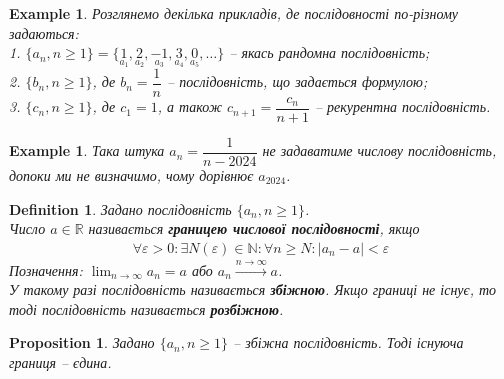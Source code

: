 \documentclass[a4paper, 14pt]{article}
\theoremstyle{theoremdd}
\theoremstyle{theoremdd}
\newtheorem{definition}[theorem]{Definition}
\theoremstyle{theoremdd}
\theoremstyle{theoremdd}
\newtheorem{example}[theorem]{Example}
\theoremstyle{theoremdd}
\newtheorem{proposition}[theorem]{Proposition}
\theoremstyle{theoremdd}
\theoremstyle{theoremdd}
\theoremstyle{theoremdd}
\begin{document}
	\begin{example}
	Розглянемо декілька прикладів, де послідовності по-різному задаються:\\
	1. $\{a_n, n \geq 1\} = \{\underset{a_1}{1},\underset{a_2}{2},\underset{a_3}{-1},\underset{a_4}{3},\underset{a_5}{0},\dots\}$ -- якась рандомна послідовність;\\
	2. $\{b_n, n \geq 1\}$, де $b_n = \dfrac{1}{n}$ -- послідовність, що задається формулою;\\
	3. $\{c_n, n \geq 1\}$, де $c_1 = 1$, а також $c_{n+1} = \dfrac{c_n}{n+1}$ -- рекурентна послідовність.
	\end{example}
	
	\begin{example}
	Така штука $a_n = \dfrac{1}{n - 2024}$ не задаватиме числову послідовність, допоки ми не визначимо, чому дорівнює $a_{2024}$.
	\end{example}
	
	\begin{definition} Задано послідовність $\{a_n, n \geq 1\}$.\\
	Число $a \in \mathbb{R}$ називається \textbf{границею числової послідовності}, якщо
	\begin{align*}
	\forall \varepsilon > 0: \exists N(\varepsilon) \in \mathbb{N}: \forall n \geq N: |a_n - a| < \varepsilon
	\end{align*}
	Позначення: $\displaystyle \lim_{n \to \infty} a_n = a$ або $a_n \xrightarrow{n \to \infty} a$.\\
	У такому разі послідовність називається \textbf{збіжною}. Якщо границі не існує, то тоді послідовність називається \textbf{розбіжною}.
	\end{definition}
	
	\begin{proposition}
	Задано $\{a_n, n \geq 1\}$ -- збіжна послідовність. Тоді існуюча границя -- єдина.
	\end{proposition}
	
\end{document}
